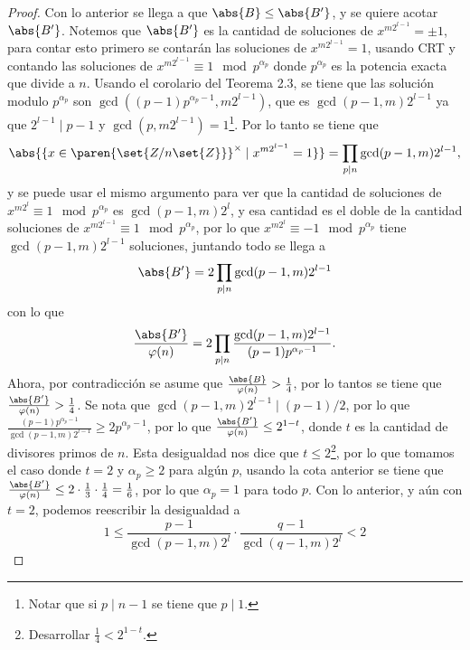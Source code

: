 \documentclass{ayudantia}
\begin{document}
\begin{proof}
    Con lo anterior se llega a que \(\abs{B}\leq\abs{B'}\), y se quiere acotar \(\abs{B'}\). Notemos que \(\abs{B'}\) es la cantidad de soluciones de \(x^{m2^{l-1}}=\pm1\), para contar esto primero se contarán las soluciones de \(x^{m2^{l-1}}= 1\), usando CRT y contando las soluciones de \(x^{m2^{l-1}}\equiv 1\mod p^{\alpha_p}\) donde \(p^{\alpha_p}\) es la potencia exacta que divide a \(n\). Usando el corolario del Teorema 2.3, se tiene que las solución modulo \(p^{\alpha_p}\) son \(\gcd((p-1)p^{\alpha_p-1},m2^{l-1})\), que es \(\gcd(p-1,m)2^{l-1}\) ya que \(2^{l-1}\mid p-1\) y \(\gcd(p,m2^{l-1})=1\)\footnote{Notar que si \(p\mid n-1\) se tiene que \(p\mid 1\).}. Por lo tanto se tiene que
    \begin{equation*}
        \abs{\{x\in\paren{\set{Z/n\set{Z}}}^\times\mid x^{m2^{l-1}}=1\}}=\prod_{p\mid n}\gcd(p-1,m)2^{l-1},
    \end{equation*}
    y se puede usar el mismo argumento para ver que la cantidad de soluciones de \(x^{m2^l}\equiv 1\mod p^{\alpha_p}\) es \(\gcd(p-1,m)2^l\), y esa cantidad es el doble de la cantidad soluciones de \(x^{m2^{l-1}}\equiv 1\mod p^{\alpha_p}\), por lo que \(x^{m2^l}\equiv -1\mod p^{\alpha_p}\) tiene \(\gcd(p-1,m)2^{l-1}\) soluciones, juntando todo se llega a
    \begin{equation*}
        \abs{B'}=2\prod_{p\mid n}\gcd(p-1,m)2^{l-1}
    \end{equation*}
    con lo que
    \begin{equation*}
        \frac{\abs{B'}}{\varphi(n)}=2\prod_{p\mid n}\frac{\gcd(p-1,m)2^{l-1}}{(p-1)p^{\alpha_p-1}}.
    \end{equation*}
    Ahora, por contradicción se asume que \(\frac{\abs{B}}{\varphi(n)}>\frac14\), por lo tantos se tiene que \(\frac{\abs{B'}}{\varphi(n)}>\frac14\). Se nota que \(\gcd(p-1,m)2^{l-1}\mid (p-1)/2\), por lo que \(\frac{(p-1)p^{\alpha_p-1}}{\gcd(p-1,m)2^{l-1}}\geq 2p^{\alpha_p-1}\), por lo que \(\frac{\abs{B'}}{\varphi(n)}\leq 2^{1-t}\), donde \(t\) es la cantidad de divisores primos de \(n\). Esta desigualdad nos dice que \(t\leq2\)\footnote{Desarrollar \(\frac14<2^{1-t}\).}, por lo que tomamos el caso donde \(t=2\) y \(\alpha_p\geq 2\) para algún \(p\), usando la cota anterior se tiene que \(\frac{\abs{B'}}{\varphi(n)}\leq 2\cdot\frac13\cdot\frac14=\frac16\), por lo que \(\alpha_p=1\) para todo \(p\). Con lo anterior, y aún con \(t=2\), podemos reescribir la desigualdad a
    \begin{equation*}
        1\leq \frac{p-1}{\gcd(p-1,m)2^l}\cdot \frac{q-1}{\gcd(q-1,m)2^l}<2

\end{equation*}
\end{proof}
\end{document}
